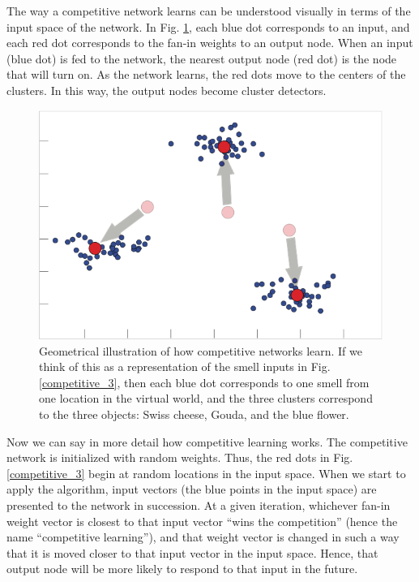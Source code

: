 The way a competitive network learns can be understood visually in terms of the input space of the network. In Fig. \ref{competitiveInputSpace}, each blue dot corresponds to an input, and each red dot corresponds to the fan-in weights to an output node. When an input (blue dot) is fed to the network, the nearest output node (red dot) is the node that will turn on. As the network learns, the red dots move to the centers of the clusters. In this way, the output nodes become cluster detectors. 

\begin{figure}[h]
\centering
\includegraphics[scale=1]{./images/competitiveInputSpace.png}
\caption[Pamela Payne.]{Geometrical illustration of how competitive networks learn. If we think of this as a representation of the smell inputs in Fig. \ref{competitive_3}, then each blue dot corresponds to one smell from one location in the virtual world, and the three clusters correspond to the three objects: Swiss cheese, Gouda, and the blue flower. }
\label{competitiveInputSpace}
\end{figure}

Now we can say in more detail how competitive learning works. The competitive network is initialized with random weights. Thus, the red dots in Fig. \ref{competitive_3} begin at random locations in the input space. When we start to apply the algorithm, input vectors (the blue points in the input space) are presented to the network in succession. At a given iteration, whichever fan-in weight vector is closest to that input vector ``wins  the competition'' (hence the name ``competitive learning''), and that weight vector is changed in such a way that it is moved closer to that input vector in the input space. Hence, that output node will be more likely to respond to that input in the future.

